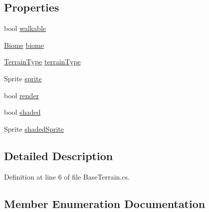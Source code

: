 \subsection*{Properties}
\begin{DoxyCompactItemize}
\item 
bool \mbox{\hyperlink{class_base_terrain_a403d7a199581bc910ecbf15009b532a6}{walkable}}
\item 
\mbox{\hyperlink{class_biome}{Biome}} \mbox{\hyperlink{class_base_terrain_a89f7a3d77182f51a257cf1f503bb6fe9}{biome}}
\item 
\mbox{\hyperlink{class_base_terrain_a5b782f4de5e1a2ca1343b4aa89a7dc9a}{Terrain\+Type}} \mbox{\hyperlink{class_base_terrain_a381e5f59e57a301a70f79c32cf3ea300}{terrain\+Type}}
\item 
Sprite \mbox{\hyperlink{class_base_terrain_a0af7f55356e035cde6cedadae6fbb34d}{sprite}}
\item 
bool \mbox{\hyperlink{class_base_terrain_a845e9830b7282650856b64db83d7633b}{render}}
\item 
bool \mbox{\hyperlink{class_base_terrain_a5c1d125049a42d2b25ef2e09166bbd91}{shaded}}
\item 
Sprite \mbox{\hyperlink{class_base_terrain_a6e60ba346bed94af204ded4f7fcf16ab}{shaded\+Sprite}}
\end{DoxyCompactItemize}


\subsection{Detailed Description}


Definition at line 6 of file Base\+Terrain.\+cs.



\subsection{Member Enumeration Documentation}
\mbox{\label{class_base_terrain_a5b782f4de5e1a2ca1343b4aa89a7dc9a}} 
